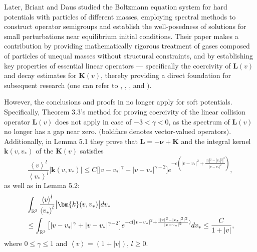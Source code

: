 \documentclass[reqno]{amsart}
\numberwithin{equation}{section}
\numberwithin{equation}{section}
\begin{document}
Later, Briant and Daus \cite{[60]Briant2016ARM} studied the Boltzmann equation system for hard potentials with particles of different masses, employing spectral methods to construct operator semigroups and establish the well-posedness of solutions for small perturbations near equilibrium initial conditions. Their paper makes a contribution ‌by‌ providing  mathematically rigorous treatment of gases composed of particles of unequal masses without structural constraints, ‌and by‌ establishing key properties of essential linear operators — ‌specifically‌ the coercivity of $\bm{L}(v)$ and‌ decay estimates for  $\bm{K}(v)$, thereby‌ providing a direct foundation for subsequent research $($one can refer to \cite{Aoki20020JDE}, \cite{Alonso2024}, \cite{BondesanCPAA}, \cite{[DL]VPB} and \cite{[50]Wu2023JDE}$)$. 

However, the conclusions and proofs ‌in \cite{[60]Briant2016ARM} no longer apply for soft potentials. Specifically, Theorem 3.3's method for proving coercivity of the linear collision operator $\bm{L}(v)$ does not apply in case of $-3<\gamma <0$, as the spectrum of 
$\bm{L}(v)$ no longer has a gap ‌near zero‌. $($boldface denotes vector-valued operators$)$.  Additionally, in \cite{[60]Briant2016ARM} Lemma 5.1 they prove that  $\bm{L}=-\bm{\nu} + \bm{K}$ and the integral kernel $\bm{k}(v,v_*)$ of the $\bm{K}(v)$ satisfies 
\begin{equation}\label{estMKB1}
	\frac{\left \langle v \right\rangle^l}{\left \langle v_* \right\rangle^l}\big|\bm{k}(v,v_*)\big|\leq C \big[|v-v_*|^{\gamma}+|v-v_*|^{\gamma-2}\big] e^{-c(|v-v_*|^2+\frac{||v|^2-|v_*|^2|^2}{|v-v_*|^2})},
\end{equation}
as well as in \cite{[60]Briant2016ARM} Lemma 5.2:
\begin{align}
	&\int_{\mathbb{R}^3 }\frac{\left \langle v \right\rangle^l}{\left \langle v_* \right\rangle^l} \big|\bm{k}(v,v_*)\big| d v_*\notag\\
	&\leq \int_{\mathbb{R}^3 }  \big[|v-v_*|^{\gamma}+|v-v_*|^{\gamma-2}\big] e^{-c(|v-v_*|^2+\frac{||v|^2-|v_*|^2|^2}{|v-v_*|^2})} d v_* \leq \frac{C}{1+|v|},\label{estMKB2}
\end{align}
where $0\leq\gamma\leq 1$ and $\left \langle v \right\rangle=(1+|v|),\,l \geq 0$. 
\end{document}
